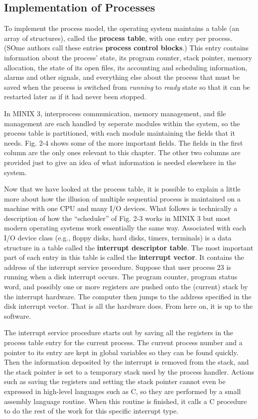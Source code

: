 \documentclass{book}
\newcommand {\kw}  [1] {\textbf{#1}}
\newcommand {\sys} [1] {\textsl{#1}}
\begin{document}
\subsection{Implementation of Processes}
To implement the process model, the operating system maintains a table (an array of structures),
called the \kw{process table}, with one entry per process.
(SOme authors call these entries \kw{process control blocks}.)
This entry contains information about the process' state, its program counter, stack pointer, memory allocation,
the state of its open files, its accounting and scheduling information, alarms and other signals,
and everything else about the process that must be saved when the process is switched from \sys{running} to \sys{ready} state 
so that it can be restarted later as if it had never been stopped.

In MINIX 3, interprocess communication, memory management, and file management are each handled by seperate modules within the system,
so the process table is partitioned, with each module maintaining the fields that it needs.
Fig. 2-4 shows some of the more important fields.
The fields in the first column are the only ones relevant to this chapter.
The other two columns are provided just to give an idea of what information is needed elsewhere in the system.

Now that we have looked at the process table,
it is possible to explain a little more about how the illusion of multiple sequential process is maintained 
on a machine with one CPU and many I/O devices.
What follows is technically a description of how the ``scheduler'' of Fig. 2-3 works in MINIX 3 
but most modern operating systems work essentially the same way.
Associated with each I/O device class (e.g., floppy disks, hard disks, timers, terminals) is a data structure in a table 
called the \kw{interrupt descriptor table}.
The most important part of each entry in this table is called the \kw{interrupt vector}.
It contains the address of the interrupt service procedure.
Suppose that user process 23 is running when a disk interrupt occurs.
The program counter, program status word, and possibly one or more registers are pushed onto the (current) stack by the interrupt hardware.
The computer then jumps to the address specified in the disk interrupt vector.
That is all the hardware does.
From here on, it is up to the software.

The interrupt service procedure starts out by saving all the registers in the process table entry for the current process.
The current process number and a pointer to its entry are kept in global variables so they can be found quickly.
Then the information deposited by the interrupt is removed from the stack, 
and the stack pointer is set to a temporary stack used by the process handler. 
Actions such as saving the registers and setting the stack pointer cannot even be expressed in high-level languages such as C,
so they are performed by a small assembly language routine.
When this routine is finished, it calls a C procedure to do the rest of the work for this specific interrupt type.
\end{document}
